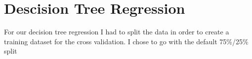 \section{Descision Tree Regression}

For our decision tree regression I had to split the data in order to create a training dataset for the cross validation. I chose to go with the default 75\%/25\% split